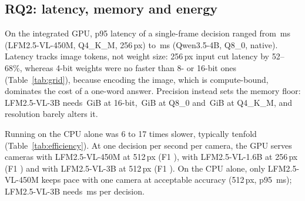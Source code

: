 
\subsection{RQ2: latency, memory and energy}
\label{sec:rq2}
On the integrated GPU, p95 latency of a single-frame decision ranged from \CLfmSQfourTwofiftysixOnePtf\,ms (LFM2.5-VL-450M, Q4\_K\_M, 256\,px) to \CQwenLQeightNatOnePtf\,ms (Qwen3.5-4B, Q8\_0, native). Latency tracks image tokens, not weight size: 256\,px input cut latency by 52--68\%, whereas 4-bit weights were no faster than 8- or 16-bit ones (Table~\ref{tab:grid}), because encoding the image, which is compute-bound, dominates the cost of a one-word answer. Precision instead sets the memory floor: LFM2.5-VL-3B needs \CLfmLHalfNatOneRss\,GiB at 16-bit, \CLfmLQeightNatOneRss\,GiB at Q8\_0 and \CLfmLQfourNatOneRss\,GiB at Q4\_K\_M, and resolution barely alters it.

Running on the CPU alone was 6 to 17 times slower, typically tenfold (Table~\ref{tab:efficiency}). At one decision per second per camera, the GPU serves \CLfmSQeightFivetwelveOneStreams{} cameras with LFM2.5-VL-450M at 512\,px (F1 \CLfmSQeightFivetwelveOneFone), \CLfmMQfourTwofiftysixOneStreams{} with LFM2.5-VL-1.6B at 256\,px (F1 \CLfmMQfourTwofiftysixOneFone) and \CLfmLQeightFivetwelveOneStreams{} with LFM2.5-VL-3B at 512\,px (F1 \CLfmLQeightFivetwelveOneFone). On the CPU alone, only LFM2.5-VL-450M keeps pace with one camera at acceptable accuracy (512\,px, p95 \CLfmSQeightFivetwelveOneCpuPtf\,ms); LFM2.5-VL-3B needs \CLfmLQeightNatOneCpuPtf\,ms per decision.


